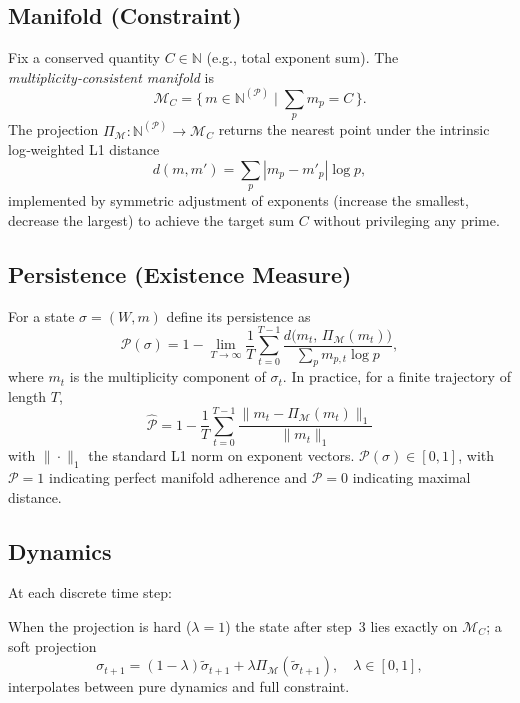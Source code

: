 \documentclass[11pt]{article}
\begin{document}
\subsection{Manifold (Constraint)}
Fix a conserved quantity $C\in\mathbb{N}$ (e.g., total exponent sum).  The \emph{multiplicity‑consistent manifold} is
\[
\mathcal{M}_C=\{\,m\in\mathbb{N}^{(\mathcal{P})}\mid \sum_{p} m_p = C\,\}.
\]
The projection $\Pi_{\mathcal{M}}:\mathbb{N}^{(\mathcal{P})}\to\mathcal{M}_C$ returns the nearest point under the intrinsic log‑weighted L1 distance
\[
d(m,m')=\sum_{p}|m_p-m'_p|\log p,
\]
implemented by symmetric adjustment of exponents (increase the smallest, decrease the largest) to achieve the target sum $C$ without privileging any prime.

\subsection{Persistence (Existence Measure)}
For a state $\sigma=(W,m)$ define its persistence as
\[
\mathcal{P}(\sigma)=1-\lim_{T\to\infty}\frac{1}{T}
\sum_{t=0}^{T-1}\frac{d\bigl(m_t,\,\Pi_{\mathcal{M}}(m_t)\bigr)}
{\displaystyle\sum_{p}m_{p,t}\log p},
\]
where $m_t$ is the multiplicity component of $\sigma_t$.  In practice, for a finite trajectory of length $T$,
\[
\widehat{\mathcal{P}}=1-\frac{1}{T}\sum_{t=0}^{T-1}
\frac{\|m_t-\Pi_{\mathcal{M}}(m_t)\|_1}
{\|m_t\|_1}
\]
with $\|\cdot\|_1$ the standard L1 norm on exponent vectors.  $\mathcal{P}(\sigma)\in[0,1]$, with $\mathcal{P}=1$ indicating perfect manifold adherence and $\mathcal{P}=0$ indicating maximal distance.

\subsection{Dynamics}
At each discrete time step:
\]
When the projection is hard ($\lambda=1$) the state after step 3 lies exactly on $\mathcal{M}_C$; a soft projection
\[
\sigma_{t+1}=(1-\lambda)\tilde{\sigma}_{t+1}+\lambda\Pi_{\mathcal{M}}(\tilde{\sigma}_{t+1}),\quad \lambda\in[0,1],
\]
interpolates between pure dynamics and full constraint.
\end{document}
